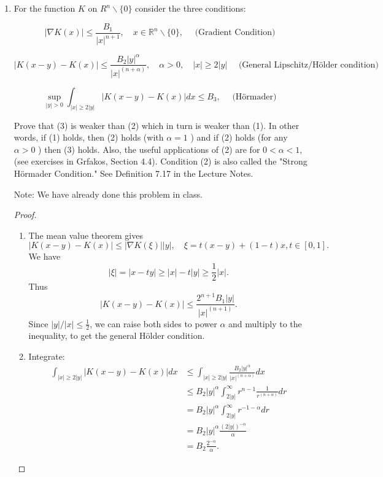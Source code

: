 
\begin{enumerate}
	\item 
		For the function $K$ on $R^n \backslash\{0\}$ consider the three conditions:

\[
|\nabla K(x)| \leq \frac{B_1}{|x|^{n+1}}, \quad x \in \mathbb{R}^n \backslash\{0\}, \quad \text { (Gradient Condition) }
\]


\[
|K(x-y)-K(x)| \leq \frac{B_2|y|^\alpha}{|x|^{(n+\alpha)}}, \quad \alpha>0, \quad|x| \geq 2|y| \quad \text { (General Lipschitz/Hölder condition) }
\]


\[
\sup _{|y|>0} \int_{|x| \geq 2|y|}|K(x-y)-K(x)| d x \leq B_3, \quad \text { (Hörmader) }
\]


Prove that (3) is weaker than (2) which in turn is weaker than (1). In other words, if (1) holds, then (2) holds (with $\alpha=1$ ) and if (2) holds (for any $\alpha>0$ ) then (3) holds. Also, the useful applications of (2) are for $0<\alpha<1$, (see exercises in Grfakos, Section 4.4). Condition (2) is also called the "Strong Hörmader Condition." See Definition 7.17 in the Lecture Notes.

Note: We have already done this problem in class.

\begin{proof}
	\begin{enumerate}
		\item The mean value theorem gives
			\[
				|K(x - y) - K(x)| \le \left| \nabla  K(\xi) \right| |y|, \quad \xi = t (x - y) + (1 - t) x, t \in [0,1]
			.\]
		We have
		\[
			|\xi| = |x - t y| \ge |x| - t |y| \ge \frac{1}{2} |x|
		.\] 
		Thus
		\[
			|K(x - y) - K(x)| \le \frac{2^{n + 1}B_1|y|}{|x|^{(n+1)}}
		.\] 
		Since $|y| / |x| \le \frac{1}{2}$, we can raise both sides to power $\alpha$ and  multiply to the inequality, to get the general H\"older condition.

		\item Integrate:
			\begin{align*}
				\int_{|x| \geq 2|y|}|K(x-y)-K(x)| d x
				&\leq \int_{|x| \geq 2|y|} \frac{B_2|y|^\alpha}{|x|^{(n+\alpha)}} d x\\
				&\leq B_2 |y|^\alpha \int_{2|y|}^{\infty } r^{n - 1}\frac{1}{r^{(n+\alpha)}} d r\\
				&= B_2 |y|^\alpha \int_{2|y|}^{\infty } r^{- 1 - \alpha} d r\\
				&= B_2 |y|^\alpha \frac{(2 |y|)^{ - \alpha}}{\alpha}\\
				&= B_2 \frac{2^{ - \alpha}}{\alpha}
			.\end{align*}
	\end{enumerate}
\end{proof}


\end{enumerate}

